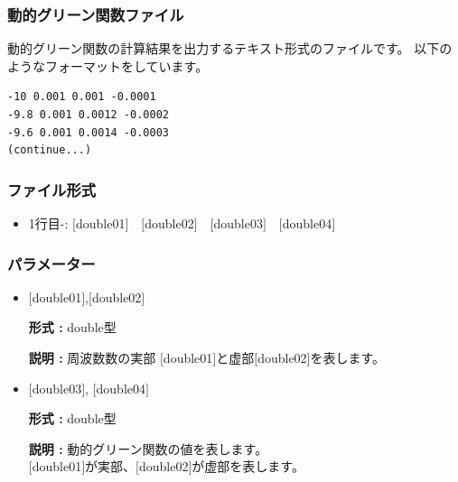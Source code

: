 \documentclass[12pt,titlepage]{jarticle}
\begin{document}
\subsubsection{動的グリーン関数ファイル}\label{subsubsec:DynamicalG}

動的グリーン関数の計算結果を出力するテキスト形式のファイルです。
以下のようなフォーマットをしています。
\\
\begin{minipage}{10cm}
\begin{screen}
\begin{verbatim}
-10 0.001 0.001 -0.0001 
-9.8 0.001 0.0012 -0.0002
-9.6 0.001 0.0014 -0.0003
(continue...)
\end{verbatim}
\end{screen}
\end{minipage}


\subsubsection{ファイル形式}
 \begin{itemize}
   \item 1行目-: $[$double01$]$~~$[$double02$]$~~$[$double03$]$~~$[$double04$]$
  \end{itemize}
\subsubsection{パラメーター}
 \begin{itemize}

  \item  $[$double01$]$,$[$double02$]$

 {\bf 形式 :} double型

{\bf 説明 :} 周波数数の実部 $[$double01$]$と虚部$[$double02$]$を表します。
 
 \item  $[$double03$]$, $[$double04$]$

 {\bf 形式 :} double型 

{\bf 説明 :} 動的グリーン関数の値を表します。\\
$[$double01$]$が実部、$[$double02$]$が虚部を表します。\\
\end{itemize}
\end{document}

